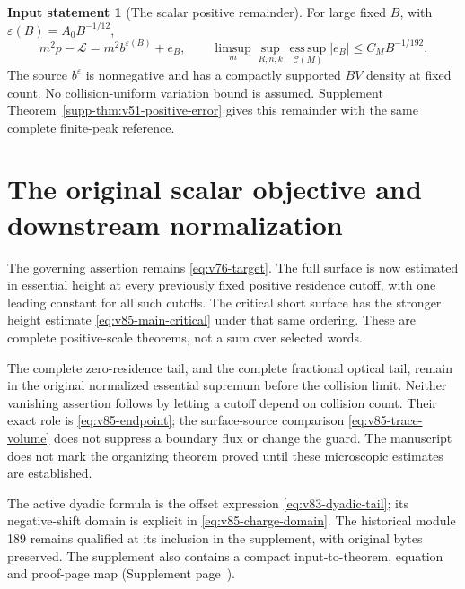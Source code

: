 \documentclass[11pt,reqno]{amsart}
\numberwithin{equation}{section}
\theoremstyle{definition}\newtheorem{definition}[theorem]{Definition}
\theoremstyle{remark}\newtheorem{remark}[theorem]{Remark}
\theoremstyle{definition}\newtheorem{inputstatement}[theorem]{Input statement}
\newcommand{\esssup}{\operatorname*{ess\,sup}}
\begin{document}
\begin{inputstatement}[The scalar positive remainder]
\label{input:v83-scalar}
For large fixed $B$, with $\varepsilon(B)=A_0B^{-1/12}$,
\begin{equation}\label{eq:v76-remainder}
 m^2p-\mathcal L=m^2b^{\varepsilon(B)}+e_B,\qquad
 \limsup_m\sup_{R,n,k}\esssup_{\mathcal C(M)}|e_B|
                                      \le C_MB^{-1/192}.
\end{equation}
The source $b^\varepsilon$ is nonnegative and has a compactly supported
$BV$ density at fixed count. No collision-uniform variation bound is
assumed. Supplement Theorem~\ref{supp-thm:v51-positive-error} gives
this remainder with the same complete finite-peak reference.
\end{inputstatement}










\section{The original scalar objective and downstream normalization}
The governing assertion remains \eqref{eq:v76-target}. The full
surface is now estimated in essential height at every previously fixed
positive residence cutoff, with one leading constant for all such
cutoffs. The critical short surface has the stronger height estimate
\eqref{eq:v85-main-critical} under that same ordering. These are
complete positive-scale theorems, not a sum over selected words.

The complete zero-residence tail, and the complete fractional optical
tail, remain in the original normalized essential supremum before the
collision limit. Neither vanishing assertion follows by letting a
cutoff depend on collision count. Their exact role is
\eqref{eq:v85-endpoint}; the surface-source comparison
\eqref{eq:v85-trace-volume} does not suppress a boundary flux or change
the guard. The manuscript does not mark the organizing theorem proved
until these microscopic estimates are established.

The active dyadic formula is the offset expression
\eqref{eq:v83-dyadic-tail}; its negative-shift domain is explicit in
\eqref{eq:v85-charge-domain}. The historical module 189 remains
qualified at its inclusion in the supplement, with original bytes
preserved. The supplement also contains a compact input-to-theorem,
equation and proof-page map (Supplement
page~\pageref{supp-v85:dependency-guide}).
\end{document}
